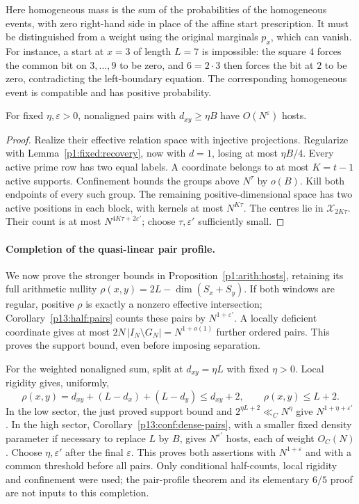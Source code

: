 Here homogeneous mass is the sum of the probabilities of the
homogeneous events, with zero right-hand side in place of the affine
start prescription.
It must be distinguished from a weight using the original marginals
$p_x$, which can vanish. For instance, a start at $x=3$ of length
$L=7$ is impossible: the square $4$ forces the common bit on
$3,\ldots,9$ to be zero, and $6=2\cdot3$ then forces the bit at $2$
to be zero, contradicting the left-boundary equation. The corresponding
homogeneous event is compatible and has positive probability.

\begin{corollary}
\label{p13:conf:dense-pairs}
For fixed \(\eta,\varepsilon>0\), nonaligned pairs
with \(d_{xy}\ge\eta B\) have \(O(N^\varepsilon)\)
hosts.
\end{corollary}

\begin{proof}
Realize their effective relation space with injective
projections. Regularize with
Lemma~\ref{p1:fixed:recovery}, now with \(d=1\),
losing at most \(\eta B/4\).
Every active prime row has two equal labels.
A coordinate belongs to at most \(K=t-1\) active supports.
Confinement bounds the groups above \(N^\tau\) by \(o(B)\).
Kill both endpoints of every such group.
The remaining positive-dimensional space has two active
positions in each block, with kernels at most \(N^{K\tau}\).
The centres lie in \(\mathcal X_{2K\tau}\).
Their count is at most \(N^{4K\tau+2\varepsilon'}\);
choose \(\tau,\varepsilon'\) sufficiently small.
\end{proof}


\paragraph{Completion of the quasi-linear pair profile.}
\label{p18:conf:pair-profile}
We now prove the stronger bounds in Proposition~\ref{p1:arith:hosts},
retaining its full arithmetic nullity
$\rho(x,y)=2L-\dim(S_x+S_y)$.
If both windows are regular, positive $\rho$ is exactly a nonzero
effective intersection; Corollary~\ref{p13:half:pairs} counts these
pairs by $N^{1+\varepsilon'}$. A locally deficient coordinate gives
at most $2N\,|I_N\setminus G_N|=N^{1+o(1)}$ further ordered pairs.
This proves the support bound, even before imposing separation.

For the weighted nonaligned sum, split at
$d_{xy}=\eta L$ with fixed $\eta>0$. Local rigidity gives, uniformly,
\[
 \rho(x,y)=d_{xy}+(L-d_x)+(L-d_y)\le d_{xy}+2,
 \qquad \rho(x,y)\le L+2.
\]
In the low sector, the just proved support bound and
$2^{\eta L+2}\ll_C N^\eta$ give
$N^{1+\eta+\varepsilon'}$. In the high sector,
Corollary~\ref{p13:conf:dense-pairs}, with a smaller fixed density
parameter if necessary to replace $L$ by $B$, gives
$N^{\varepsilon'}$ hosts, each of weight $O_C(N)$.
Choose $\eta,\varepsilon'$ after the final $\varepsilon$.
This proves both assertions with $N^{1+\varepsilon}$ and with a
common threshold before all pairs. Only conditional half-counts,
local rigidity and confinement were used; the pair-profile theorem
and its elementary $6/5$ proof are not inputs to this completion.

